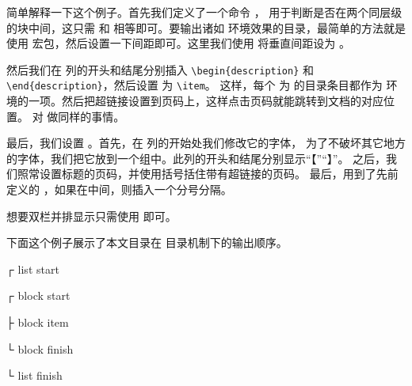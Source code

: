 \documentclass[twoside]{book}
\begin{document}
简单解释一下这个例子。首先我们定义了一个命令 ，
用于判断是否在两个同层级的块中间，这只需 \cmd\tocthelevel 和 \cmd\tocthenextlevel
相等即可。要输出诸如  环境效果的目录，最简单的方法就是使用
 宏包，然后设置一下间距即可。这里我们使用  将垂直间距设为 
\opt{0pt}。

然后我们在  列的开头和结尾分别插入 \verb|\begin{description}| 和
\\\verb|\end{description}|，然后设置  为 \verb|\item|。
这样，每个  为  的目录条目都作为 
环境的一项。然后把超链接设置到页码上，这样点击页码就能跳转到文档的对应位置。
对  做同样的事情。

最后，我们设置 。首先，在  列的开始处我们修改它的字体，
为了不破坏其它地方的字体，我们把它放到一个组中。此列的开头和结尾分别显示“【”“】”。
之后，我们照常设置标题的页码，并使用括号括住带有超链接的页码。
最后，用到了先前定义的 ，如果在中间，则插入一个分号分隔。

想要双栏并排显示只需使用  即可。

\enlargethispage{10pt}
下面这个例子展示了本文目录在 \CusTeX 目录机制下的输出顺序。
\begin{xample}
\startmulticolumns[cols=4,ragged,column-sep=10pt]
\newcommand{}
\newcommand\showhbarl{\Replicate{2*(\tocthelevel-\tochilevel)}{│}} 
\newcommand\showhbarb{\Replicate{2*(\tocthelevel-\tochilevel)+1}{│}} 
  {\showhbarl ┌ \showthelevel list start\par}
  {\showhbarb ┌ \showthelevel block start\par}
  {\showhbarb ├ \showthelevel block item\par}
  {\showhbarb └ \showthelevel block finish\par}
  {\showhbarl └ \showthelevel list finish\par}
\setlength{\parindent}{0pt}
\setlength{\lineskip}{0pt} \setlength{\lineskiplimit}{\maxdimen}
\small
\specifiedtoc 
\stopmulticolumns 
\stopxamplecode
\xamplecode\label{eg:toc-code-order}\medskip 
\end{xample}
\end{document}
